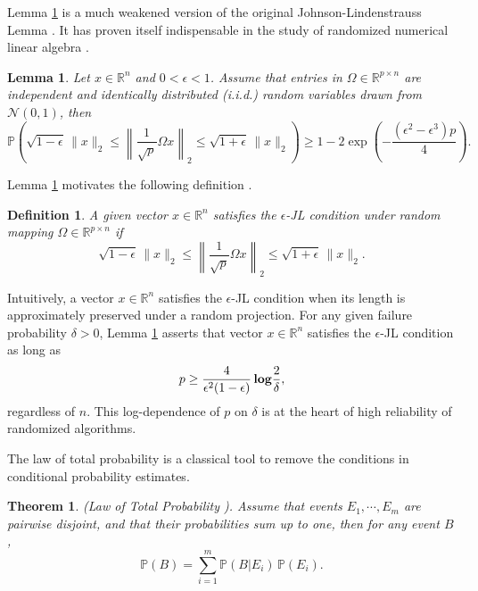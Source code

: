 \documentclass[11pt]{article}
\newtheorem{theorem}{Theorem}[section]
\newtheorem{definition}{Definition}[section]
\newtheorem{lemma}{Lemma}[section]
\begin{document}
Lemma \ref{Le:JL lemma} is a much weakened version of the original Johnson-Lindenstrauss Lemma \cite{johnson1984extensions, vempala2005random}. It has proven itself indispensable in the study of randomized numerical linear algebra \cite{melgaard2015gaussian, xiao2016spectrum}.
\begin{lemma}\label{Le:JL lemma} Let $x \in \mathbb{R}^n$ and $ 0 < \epsilon < 1$. Assume that entries in $\Omega \in \mathbb{R}^{p \times n}$ are independent and identically distributed (i.i.d.) random variables drawn from $\mathcal{N} (0,1)$, then 
\begin{equation*}
\mathbb{P} \left( \sqrt{1 - \epsilon}\, \| x \|_2 \le \left\| \frac{1}{\sqrt{p}} \Omega x \right\|_2 \le \sqrt{1 + \epsilon} \, \| x \|_2 \right) \ge 1 - 2 \exp{ \left( - \frac{(\epsilon^2 - \epsilon^3) p}{4} \right) }.
\end{equation*}
\end{lemma}
Lemma \ref{Le:JL lemma} motivates the following definition \cite{melgaard2015gaussian}.
\begin{definition} \label{De:JL condition}
A given vector $x \in \mathbb{R}^n$ satisfies the $\epsilon$-JL condition under random mapping $\Omega \in \mathbb{R}^{p \times n}$ if
$$
\sqrt{1 - \epsilon} \,\| x \|_2 \le \left\| \frac{1}{\sqrt{p}} \Omega x \right\|_2 \le \sqrt{1 + \epsilon} \, \| x \|_2.
$$
\end{definition}
Intuitively, a vector $x \in \mathbb{R}^n$ satisfies the $\epsilon$-JL condition when its length is approximately preserved under a random projection. For any given failure probability $\delta > 0$, Lemma \ref{Le:JL lemma} asserts that vector $x \in \mathbb{R}^n$ satisfies the $\epsilon$-JL condition as long as 
\[ p \ge \frac{4}{\epsilon^2(1 - \epsilon)} \, {\bf log} \frac{2}{\delta}, \]
regardless of $n$. This log-dependence of $p$ on $\delta$ is at the heart of high reliability of randomized algorithms. 

The law of total probability \cite{zwillinger1999crc} is a classical tool to remove the conditions in conditional probability estimates. 
\begin{theorem}\label{Th:Law of Total Probability}
(Law of Total Probability \cite{zwillinger1999crc}). Assume that events $E_1, \cdots, E_m$ are pairwise disjoint, and that their probabilities sum up to one, then for any event $B$, 
$$
\mathbb{P}(B) = \sum_{i = 1}^{m} \mathbb{P} (B | E_i) \,  \mathbb{P} (E_i).
$$
\end{theorem}
\end{document}
